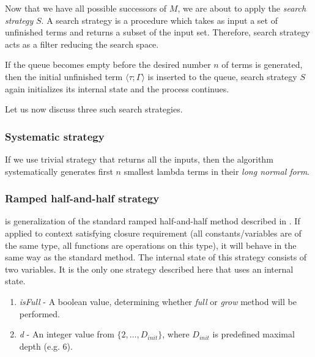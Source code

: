 \documentclass{llncs}
\newcommand{\Lets}{Let us\xspace}
\newcommand{\setDots}[2]{ \lbrace #1 , \dots , #2 \rbrace}
\newcommand{\ul}[2]{\langle #1 ; #2 \rangle}
\begin{document}
Now that we have all possible successors of $M$, we are about to apply
the \textit{search strategy} $S$. A search strategy is a procedure
which takes as input a set of unfinished terms and returns a subset
of the input set. Therefore, search strategy acts as a filter reducing 
the search space. 

If the queue becomes empty before the desired number $n$ of terms
is generated, then the initial unfinished term $\ul{\tau}{\Gamma}$ 
is inserted to the queue, search strategy $S$
again initializes its internal state and the process continues.

\Lets now discuss three such search strategies.



\subsubsection{Systematic strategy}

If we use trivial strategy that returns all the inputs, 
then the algorithm systematically generates 
first $n$ smallest lambda terms in their
\textit{long normal form}.

\subsubsection{Ramped half-and-half strategy}
is generalization of the standard ramped half-and-half method described 
in \cite{koza92}. If applied to context satisfying closure requirement
(all constants/variables are of the same type, all functions are operations
on this type), it will behave in the same way as the standard method.
The internal state of this strategy consists of two variables.
It is the only one strategy described here that uses an internal state.

\begin{enumerate}
 \item \textit{isFull} - A boolean value, determining whether \textit{full}
                     or \textit{grow} method will be performed.
 \item \textit{d} - An integer value from $\setDots{2}{D_{init}}$, where 
                $D_{init}$ is predefined maximal depth (e.g. 6).                    
\end{enumerate}
\end{document}

